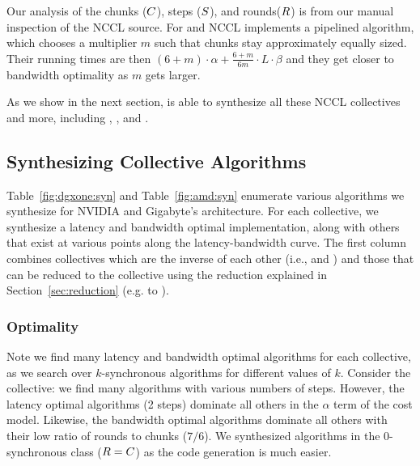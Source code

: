 Our analysis of the chunks ($C$), steps ($S$), and rounds($R$) is from our manual
inspection of the NCCL source. For \reduce and \broadcast NCCL implements a
pipelined algorithm, which chooses a multiplier $m$ such that chunks stay
approximately equally sized. Their running times are then $(6+m) \cdot \alpha + \frac{6+m}{6m}\cdot L \cdot \beta$
and they get closer to bandwidth optimality as $m$ gets larger.

As we show in the next section, \tool{} is able to synthesize all
these NCCL collectives and more, including \scatter, \gathercoll, and
\alltoall.  


\subsection{Synthesizing Collective Algorithms}
Table~\ref{fig:dgxone:syn} and Table~\ref{fig:amd:syn} enumerate
various algorithms we synthesize for NVIDIA \dgxone and Gigabyte's
\amd architecture.  For each collective, we synthesize a latency and
bandwidth optimal implementation, along with others that exist at
various points along the latency-bandwidth curve. The first column
combines collectives which are the inverse of each other (i.e.,
\scatter and \gathercoll) and those that can be reduced to the 
\broadcasting collective using the reduction explained in
Section~\ref{sec:reduction} (e.g. \reduce to \broadcast).

\subsubsection{Optimality}
Note we find many latency and bandwidth optimal algorithms
for each collective, as we search over $k$-synchronous algorithms for different values of $k$. 
Consider the \allgather collective: we find many algorithms with various numbers
of steps. However, the latency optimal algorithms (2 steps) dominate all others
in the $\alpha$ term of the cost model.  Likewise, the bandwidth optimal
algorithms dominate all others with their low ratio of rounds to chunks ($7/6$).
We synthesized algorithms in the $0$-synchronous class ($R = C$) as 
the code generation is much easier. 

